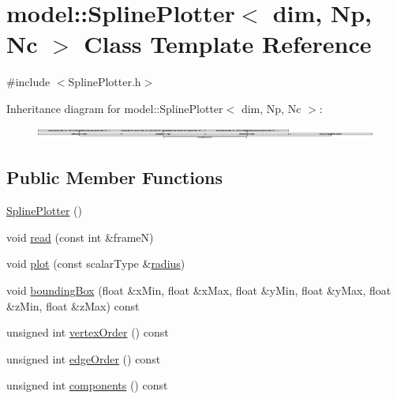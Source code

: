 \hypertarget{classmodel_1_1_spline_plotter}{}\section{model\+:\+:Spline\+Plotter$<$ dim, Np, Nc $>$ Class Template Reference}
\label{classmodel_1_1_spline_plotter}


{\ttfamily \#include $<$Spline\+Plotter.\+h$>$}

Inheritance diagram for model\+:\+:Spline\+Plotter$<$ dim, Np, Nc $>$\+:\begin{figure}[H]
\begin{center}
\leavevmode
\includegraphics[height=0.362694cm]{classmodel_1_1_spline_plotter}
\end{center}
\end{figure}
\subsection*{Public Member Functions}
\begin{DoxyCompactItemize}
\item 
\hyperlink{classmodel_1_1_spline_plotter_a9114dc09c842df0471020d6f11857d80}{Spline\+Plotter} ()
\item 
void \hyperlink{classmodel_1_1_spline_plotter_a6c1fdbfd3c9f8f1afb0ff6d77f3e1f9f}{read} (const int \&frame\+N)
\item 
void \hyperlink{classmodel_1_1_spline_plotter_a524ecb05f0ef5def0fd6a16baeaf27cf}{plot} (const scalar\+Type \&\hyperlink{tube_plotter_8m_acc620a89e606f875661525fd6365a421}{radius})
\item 
void \hyperlink{classmodel_1_1_spline_plotter_ad803c629fb4f1b2cd3aa94795b8fedb1}{bounding\+Box} (float \&x\+Min, float \&x\+Max, float \&y\+Min, float \&y\+Max, float \&z\+Min, float \&z\+Max) const 
\item 
unsigned int \hyperlink{classmodel_1_1_spline_plotter_ab9936bc8d5593103e5f0b2db0bf1d216}{vertex\+Order} () const 
\item 
unsigned int \hyperlink{classmodel_1_1_spline_plotter_ae0c13a847e280c8af2a26b1a7a367e18}{edge\+Order} () const 
\item 
unsigned int \hyperlink{classmodel_1_1_spline_plotter_a5e160da60cdb089ce70f6152575a2124}{components} () const 
\end{DoxyCompactItemize}
